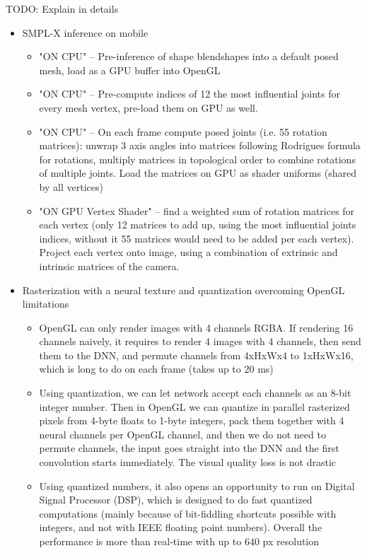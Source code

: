 \alert{TODO: Explain in details}
\begin{itemize}
	\item SMPL-X inference on mobile
	\begin{itemize}
		\item  "ON CPU" -- Pre-inference of shape blendshapes into a default posed mesh, load as a GPU buffer into OpenGL
		\item "ON CPU" -- Pre-compute indices of 12 the most influential joints for every mesh vertex, pre-load them on GPU as well.
		\item "ON CPU" -- On each frame compute posed joints (i.e. 55 rotation matrices): unwrap 3 axis angles into matrices following Rodrigues formula for rotations, multiply matrices in topological order to combine rotations of multiple joints. Load the matrices on GPU as shader uniforms (shared by all vertices)
		\item "ON GPU Vertex Shader" -- find a weighted sum of rotation matrices for each vertex (only 12 matrices to add up, using the most influential joints indices, without it 55 matrices would need to be added per each vertex). Project each vertex onto image, using a combination of extrinsic and intrinsic matrices of the camera.
	\end{itemize}
	\item Rasterization with a neural texture and quantization overcoming OpenGL limitations
	\begin{itemize}
		\item OpenGL can only render images with 4 channels RGBA. If rendering 16 channels naively, it requires to render 4 images with 4 channels, then send them to the DNN, and permute channels from 4xHxWx4 to 1xHxWx16, which is long to do on each frame (takes up to 20 ms)
		\item Using quantization, we can let network accept each channels as an 8-bit integer number. Then in OpenGL we can quantize in parallel rasterized pixels from 4-byte floats to 1-byte integers, pack them together with 4 neural channels per OpenGL channel, and then we do not need to permute channels, the input goes straight into the DNN and the first convolution starts immediately. The visual quality loss is not drastic
		\item Using quantized numbers, it also opens an opportunity to run on Digital Signal Processor (DSP), which is designed to do fast quantized computations (mainly because of bit-fiddling shortcuts possible with integers, and not with IEEE floating point numbers). Overall the performance is more than real-time with up to 640 px resolution

\end{itemize}
\end{itemize}
